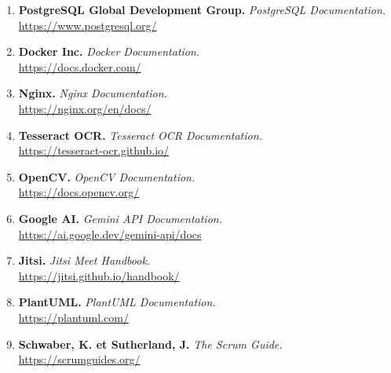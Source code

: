 \begin{enumerate}
    \item \textbf{PostgreSQL Global Development Group.} \textit{PostgreSQL Documentation.}\\
    \url{https://www.postgresql.org/}\\

    \item \textbf{Docker Inc.} \textit{Docker Documentation.}\\
    \url{https://docs.docker.com/}\\

    \item \textbf{Nginx.} \textit{Nginx Documentation.}\\
    \url{https://nginx.org/en/docs/}\\

    \item \textbf{Tesseract OCR.} \textit{Tesseract OCR Documentation.}\\
    \url{https://tesseract-ocr.github.io/}\\

    \item \textbf{OpenCV.} \textit{OpenCV Documentation.}\\
    \url{https://docs.opencv.org/}\\

    \item \textbf{Google AI.} \textit{Gemini API Documentation.}\\
    \url{https://ai.google.dev/gemini-api/docs}\\

    \item \textbf{Jitsi.} \textit{Jitsi Meet Handbook.}\\
    \url{https://jitsi.github.io/handbook/}\\

    \item \textbf{PlantUML.} \textit{PlantUML Documentation.}\\
    \url{https://plantuml.com/}\\

    \item \textbf{Schwaber, K. et Sutherland, J.} \textit{The Scrum Guide.}\\
    \url{https://scrumguides.org/}\\

\end{enumerate}
